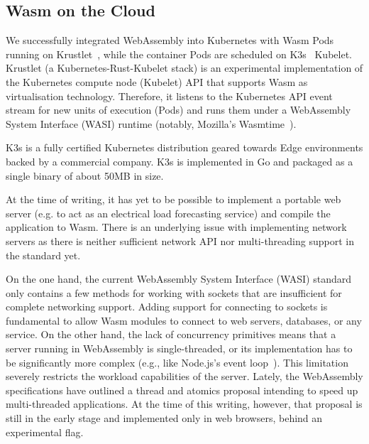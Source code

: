 \subsection{Wasm on the Cloud}

We successfully integrated WebAssembly into Kubernetes with Wasm Pods running on Krustlet~\cite{krustlet}, while the container Pods are scheduled on K3s~\cite{k3s} Kubelet. Krustlet (a Kubernetes-Rust-Kubelet stack) is an experimental implementation of the Kubernetes compute node (Kubelet) API that supports Wasm as virtualisation technology. Therefore, it listens to the Kubernetes API event stream for new units of execution (Pods) and runs them under a WebAssembly System Interface (WASI) runtime (notably, Mozilla's Wasmtime~\cite{wasmtime}).

K3s is a fully certified Kubernetes distribution geared towards Edge environments backed by a commercial company. K3s is implemented in Go and packaged as a single binary of about 50MB in size.

At the time of writing, it has yet to be possible to implement a portable web server (e.g. to act as an electrical load forecasting service) and compile the application to Wasm. There is an underlying issue with implementing network servers as there is neither sufficient network API nor multi-threading support in the standard yet.

On the one hand, the current WebAssembly System Interface (WASI) standard only contains a few methods for working with sockets that are insufficient for complete networking support. Adding support for connecting to sockets is fundamental to allow Wasm modules to connect to web servers, databases, or any service.
On the other hand, the lack of concurrency primitives means that a server running in WebAssembly is single-threaded, or its implementation has to be significantly more complex (e.g., like Node.js's event loop~\cite{nodejs-event-loop}). This limitation severely restricts the workload capabilities of the server. Lately, the WebAssembly specifications have outlined a thread and atomics proposal intending to speed up multi-threaded applications. At the time of this writing, however, that proposal is still in the early stage and implemented only in web browsers, behind an experimental flag.


